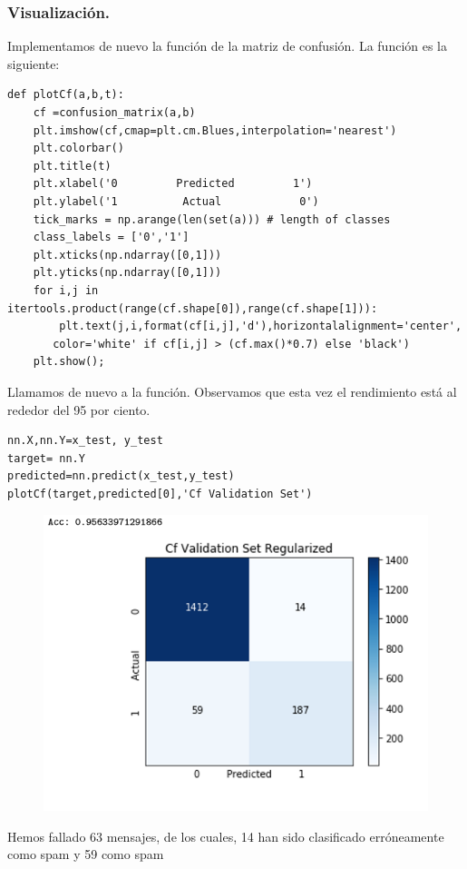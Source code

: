 \documentclass[a4paper,10pt]{article}
\begin{document}
\subsubsection{Visualización.}
Implementamos de nuevo la función de la matriz de confusión. La función es la siguiente:
\begin{lstlisting}
def plotCf(a,b,t):
    cf =confusion_matrix(a,b)
    plt.imshow(cf,cmap=plt.cm.Blues,interpolation='nearest')
    plt.colorbar()
    plt.title(t)
    plt.xlabel('0         Predicted         1')
    plt.ylabel('1          Actual            0')
    tick_marks = np.arange(len(set(a))) # length of classes
    class_labels = ['0','1']
    plt.xticks(np.ndarray([0,1]))
    plt.yticks(np.ndarray([0,1]))
    for i,j in itertools.product(range(cf.shape[0]),range(cf.shape[1])):
        plt.text(j,i,format(cf[i,j],'d'),horizontalalignment='center',    
	   color='white' if cf[i,j] > (cf.max()*0.7) else 'black')
    plt.show();
\end{lstlisting}
Llamamos de nuevo a la función. Observamos que esta vez el rendimiento está al rededor del 95 por ciento.
\begin{lstlisting}
nn.X,nn.Y=x_test, y_test 
target= nn.Y
predicted=nn.predict(x_test,y_test) 
plotCf(target,predicted[0],'Cf Validation Set')
\end{lstlisting}
\begin{figure}[H]
\centering
\includegraphics[scale=0.6]{Annotation 2020-03-23 161410}
\end{figure}
Hemos fallado 63 mensajes, de los cuales, 14 han sido clasificado erróneamente como spam y 59 como spam
\end{document}
